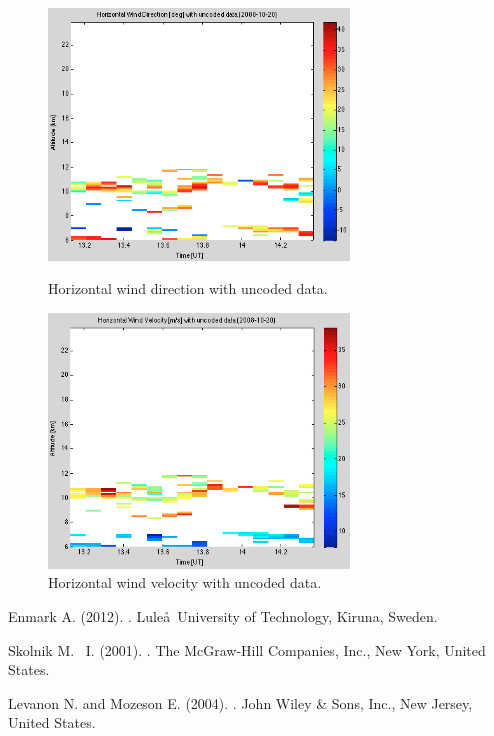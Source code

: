 \documentclass{article}
\begin{document}
\begin{figure}[htb]
\begin{minipage}[t]{0.5\linewidth}
\centering
\includegraphics[width=8cm]{Figures/wind_dir_uncoded.png}
\caption{Horizontal wind direction with uncoded data.}
\label{fig:wind_dir_uncoded}
\end{minipage}
\begin{minipage}[t]{0.5\linewidth}
\centering
\includegraphics[width=8cm]{Figures/wind_vel_uncoded.png}
\caption{Horizontal wind velocity with uncoded data.}
\label{fig:wind_vel_uncoded}
\end{minipage}
\end{figure}



\begin{thebibliography}{9}

Enmark A.  (2012).
.
\newblock Lule\aa \ University of Technology, Kiruna, Sweden.

Skolnik M. ~I.  (2001).
.
\newblock The McGraw-Hill Companies, Inc., New York, United States.

Levanon N. and Mozeson E. (2004).
.
\newblock John Wiley \& Sons, Inc., New Jersey, United States.
\end{thebibliography}
\end{document}

